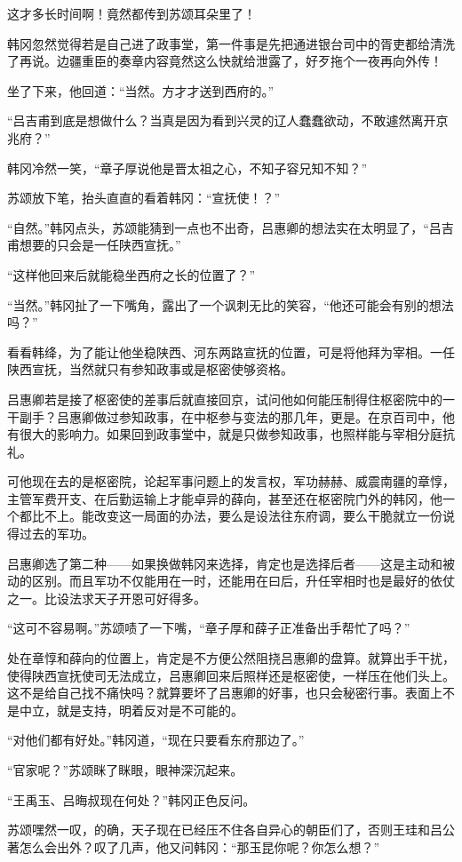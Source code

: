这才多长时间啊！竟然都传到苏颂耳朵里了！

韩冈忽然觉得若是自己进了政事堂，第一件事是先把通进银台司中的胥吏都给清洗了再说。边疆重臣的奏章内容竟然这么快就给泄露了，好歹拖个一夜再向外传！

坐了下来，他回道：“当然。方才才送到西府的。”

“吕吉甫到底是想做什么？当真是因为看到兴灵的辽人蠢蠢欲动，不敢遽然离开京兆府？”

韩冈冷然一笑，“章子厚说他是晋太祖之心，不知子容兄知不知？”

苏颂放下笔，抬头直直的看着韩冈：“宣抚使！？”

“自然。”韩冈点头，苏颂能猜到一点也不出奇，吕惠卿的想法实在太明显了，“吕吉甫想要的只会是一任陕西宣抚。”

“这样他回来后就能稳坐西府之长的位置了？”

“当然。”韩冈扯了一下嘴角，露出了一个讽刺无比的笑容，“他还可能会有别的想法吗？”

看看韩绛，为了能让他坐稳陕西、河东两路宣抚的位置，可是将他拜为宰相。一任陕西宣抚，当然就只有参知政事或是枢密使够资格。

吕惠卿若是接了枢密使的差事后就直接回京，试问他如何能压制得住枢密院中的一干副手？吕惠卿做过参知政事，在中枢参与变法的那几年，更是。在京百司中，他有很大的影响力。如果回到政事堂中，就是只做参知政事，也照样能与宰相分庭抗礼。

可他现在去的是枢密院，论起军事问题上的发言权，军功赫赫、威震南疆的章惇，主管军费开支、在后勤运输上才能卓异的薛向，甚至还在枢密院门外的韩冈，他一个都比不上。能改变这一局面的办法，要么是设法往东府调，要么干脆就立一份说得过去的军功。

吕惠卿选了第二种——如果换做韩冈来选择，肯定也是选择后者——这是主动和被动的区别。而且军功不仅能用在一时，还能用在曰后，升任宰相时也是最好的依仗之一。比设法求天子开恩可好得多。

“这可不容易啊。”苏颂啧了一下嘴，“章子厚和薛子正准备出手帮忙了吗？”

处在章惇和薛向的位置上，肯定是不方便公然阻挠吕惠卿的盘算。就算出手干扰，使得陕西宣抚使司无法成立，吕惠卿回来后照样还是枢密使，一样压在他们头上。这不是给自己找不痛快吗？就算要坏了吕惠卿的好事，也只会秘密行事。表面上不是中立，就是支持，明着反对是不可能的。

“对他们都有好处。”韩冈道，“现在只要看东府那边了。”

“官家呢？”苏颂眯了眯眼，眼神深沉起来。

“王禹玉、吕晦叔现在何处？”韩冈正色反问。

苏颂嘿然一叹，的确，天子现在已经压不住各自异心的朝臣们了，否则王珪和吕公著怎么会出外？叹了几声，他又问韩冈：“那玉昆你呢？你怎么想？”


